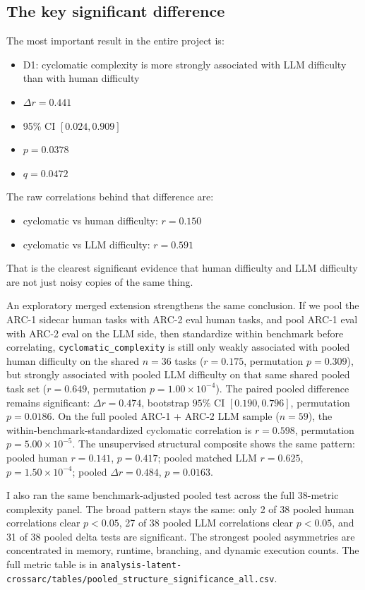 \documentclass[11pt]{article}
\begin{document}
\subsection*{The key significant difference}

The most important result in the entire project is:

\begin{itemize}
  \item D1: cyclomatic complexity is more strongly associated with LLM difficulty than with human difficulty
  \item $\Delta r = 0.441$
  \item 95\% CI $[0.024, 0.909]$
  \item $p = 0.0378$
  \item $q = 0.0472$
\end{itemize}

The raw correlations behind that difference are:

\begin{itemize}
  \item cyclomatic vs human difficulty: $r = 0.150$
  \item cyclomatic vs LLM difficulty: $r = 0.591$
\end{itemize}

That is the clearest significant evidence that human difficulty and LLM difficulty are not just noisy copies of the same thing.

An exploratory merged extension strengthens the same conclusion. If we pool the ARC-1 sidecar human tasks with ARC-2 eval human tasks, and pool ARC-1 eval with ARC-2 eval on the LLM side, then standardize within benchmark before correlating, \texttt{cyclomatic\_complexity} is still only weakly associated with pooled human difficulty on the shared $n = 36$ tasks ($r = 0.175$, permutation $p = 0.309$), but strongly associated with pooled LLM difficulty on that same shared pooled task set ($r = 0.649$, permutation $p = 1.00\times10^{-4}$). The paired pooled difference remains significant: $\Delta r = 0.474$, bootstrap $95\%$ CI $[0.190, 0.796]$, permutation $p = 0.0186$. On the full pooled ARC-1 + ARC-2 LLM sample ($n = 59$), the within-benchmark-standardized cyclomatic correlation is $r = 0.598$, permutation $p = 5.00\times10^{-5}$. The unsupervised structural composite shows the same pattern: pooled human $r = 0.141$, $p = 0.417$; pooled matched LLM $r = 0.625$, $p = 1.50\times10^{-4}$; pooled $\Delta r = 0.484$, $p = 0.0163$.

I also ran the same benchmark-adjusted pooled test across the full 38-metric complexity panel. The broad pattern stays the same: only 2 of 38 pooled human correlations clear $p < 0.05$, 27 of 38 pooled LLM correlations clear $p < 0.05$, and 31 of 38 pooled delta tests are significant. The strongest pooled asymmetries are concentrated in memory, runtime, branching, and dynamic execution counts. The full metric table is in \texttt{analysis-latent-crossarc/tables/pooled\_structure\_significance\_all.csv}.
\end{document}
